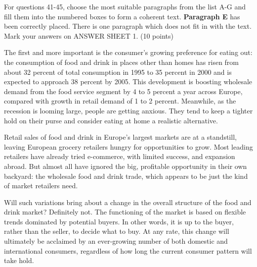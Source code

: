 \documentclass[12pt,a4paper]{article}
\begin{document}
\begin{partb}{
For questions 41-45, choose the most suitable paragraphs from the list A-G and fill them into the numbered boxes to form a coherent text. \textbf{Paragraph E} has been correctly placed. There is one paragraph which does not fit in with the text. Mark your answers on ANSWER SHEET 1. (10 points)
}

\begin{enumerate}[label={[\Alph*]}, leftmargin=2em, itemsep=0.5em]
    \item The first and more important is the consumer's growing preference for eating out: the consumption of food and drink in places other than homes has risen from about 32 percent of total consumption in 1995 to 35 percent in 2000 and is expected to approach 38 percent by 2005. This development is boosting wholesale demand from the food service segment by 4 to 5 percent a year across Europe, compared with growth in retail demand of 1 to 2 percent. Meanwhile, as the recession is looming large, people are getting anxious. They tend to keep a tighter hold on their purse and consider eating at home a realistic alternative.

    \item Retail sales of food and drink in Europe's largest markets are at a standstill, leaving European grocery retailers hungry for opportunities to grow. Most leading retailers have already tried e-commerce, with limited success, and expansion abroad. But almost all have ignored the big, profitable opportunity in their own backyard: the wholesale food and drink trade, which appears to be just the kind of market retailers need.

    \item Will such variations bring about a change in the overall structure of the food and drink market? Definitely not. The functioning of the market is based on flexible trends dominated by potential buyers. In other words, it is up to the buyer, rather than the seller, to decide what to buy. At any rate, this change will ultimately be acclaimed by an ever-growing number of both domestic and international consumers, regardless of how long the current consumer pattern will take hold.


\end{enumerate}
\end{partb}
\end{document}
